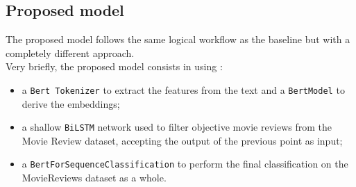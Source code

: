 \subsection{Proposed model}
The proposed model follows the same logical workflow as the baseline but with a completely different approach.\\
Very briefly, the proposed model consists in using :
\begin{itemize}
    \item a \texttt{Bert Tokenizer} \cite{tokenizer} to extract the features from the text and a \texttt{BertModel} \cite{model} to derive the embeddings;
    \item a shallow \texttt{BiLSTM} network used to filter objective movie reviews from the Movie Review dataset, accepting the output of the previous point as input;
    \item a \texttt{BertForSequenceClassification} to perform the final classification on the MovieReviews dataset as a whole.
\end{itemize}

